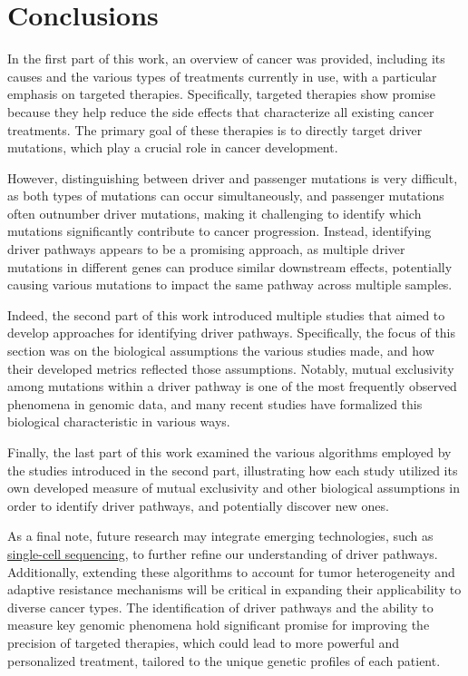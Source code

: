 \chapter*{Conclusions}


In the first part of this work, an overview of cancer was provided, including its causes and the various types of treatments currently in use, with a particular emphasis on targeted therapies. Specifically, targeted therapies show promise because they help reduce the side effects that characterize all existing cancer treatments. The primary goal of these therapies is to directly target driver mutations, which play a crucial role in cancer development.

However, distinguishing between driver and passenger mutations is very difficult, as both types of mutations can occur simultaneously, and passenger mutations often outnumber driver mutations, making it challenging to identify which mutations significantly contribute to cancer progression. Instead, identifying driver pathways appears to be a promising approach, as multiple driver mutations in different genes can produce similar downstream effects, potentially causing various mutations to impact the same pathway across multiple samples.

Indeed, the second part of this work introduced multiple studies that aimed to develop approaches for identifying driver pathways. Specifically, the focus of this section was on the biological assumptions the various studies made, and how their developed metrics reflected those assumptions. Notably, mutual exclusivity among mutations within a driver pathway is one of the most frequently observed phenomena in genomic data, and many recent studies have formalized this biological characteristic in various ways.

Finally, the last part of this work examined the various algorithms employed by the studies introduced in the second part, illustrating how each study utilized its own developed measure of mutual exclusivity and other biological assumptions in order to identify driver pathways, and potentially discover new ones.

As a final note, future research may integrate emerging technologies, such as \href{https://en.wikipedia.org/wiki/Single-cell_sequencing}{single-cell sequencing}, to further refine our understanding of driver pathways. Additionally, extending these algorithms to account for tumor heterogeneity and adaptive resistance mechanisms will be critical in expanding their applicability to diverse cancer types. The identification of driver pathways and the ability to measure key genomic phenomena hold significant promise for improving the precision of targeted therapies, which could lead to more powerful and personalized treatment, tailored to the unique genetic profiles of each patient.
